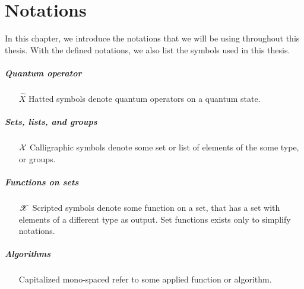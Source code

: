 \chapter*{Notations}
In this chapter, we introduce the notations that we will be using throughout this thesis. With the defined notations, we also list the symbols used in this thesis. 

\paragraph{Quantum operator}
\begin{itemize}[leftmargin=4em, align=left]
    \item[$\hat{X}$]  Hatted symbols denote quantum operators on a quantum state.
\end{itemize}

\paragraph{Sets, lists, and groups}
\begin{itemize}[leftmargin=4em, align=left]
    \item[$\mathcal{X}$]  Calligraphic symbols denote some set  or list of elements of the some type, or groups. 
\end{itemize}

\paragraph{Functions on sets}
\begin{itemize}[leftmargin=4em, align=left]
    \item[$\mathscr{X}$]  Scripted symbols denote some function on a set, that has a set with elements of a different type as output. Set functions exists only to simplify notations. 
\end{itemize}

\paragraph{Algorithms}
\begin{itemize}[leftmargin=4em, align=left]
    \item[\codefunc{AlgorithmX}] Capitalized mono-spaced refer to some applied function or algorithm. 
\end{itemize}

